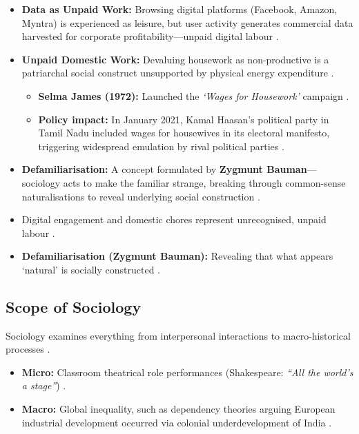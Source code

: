 \begin{CriticalPoint}
\begin{itemize}
    \item \textbf{Data as Unpaid Work:} Browsing digital platforms (Facebook, Amazon, Myntra) is experienced as leisure, but user activity generates commercial data harvested for corporate profitability---unpaid digital labour .
    \item \textbf{Unpaid Domestic Work:} Devaluing housework as non-productive is a patriarchal social construct unsupported by physical energy expenditure .
    \begin{itemize}
        \item \textbf{Selma James (1972):} Launched the \textit{`Wages for Housework'} campaign .
        \item \textbf{Policy impact:} In January 2021, Kamal Haasan's political party in Tamil Nadu included wages for housewives in its electoral manifesto, triggering widespread emulation by rival political parties .
    \end{itemize}
    \item \textbf{Defamiliarisation:} A concept formulated by \textbf{Zygmunt Bauman}---sociology acts to make the familiar strange, breaking through common-sense naturalisations to reveal underlying social construction .
\end{itemize}
\end{CriticalPoint}

\begin{QuickRevision}
\begin{itemize}
    \item Digital engagement and domestic chores represent unrecognised, unpaid labour .
    \item \textbf{Defamiliarisation (Zygmunt Bauman):} Revealing that what appears `natural' is socially constructed .
\end{itemize}
\end{QuickRevision}

\subsection{Scope of Sociology}
Sociology examines everything from interpersonal interactions to macro-historical processes .

\begin{ExampleBox}
\begin{itemize}
    \item \textbf{Micro:} Classroom theatrical role performances (Shakespeare: \textit{``All the world's a stage''}) .
    \item \textbf{Macro:} Global inequality, such as dependency theories arguing European industrial development occurred via colonial underdevelopment of India .
\end{itemize}
\end{ExampleBox}

